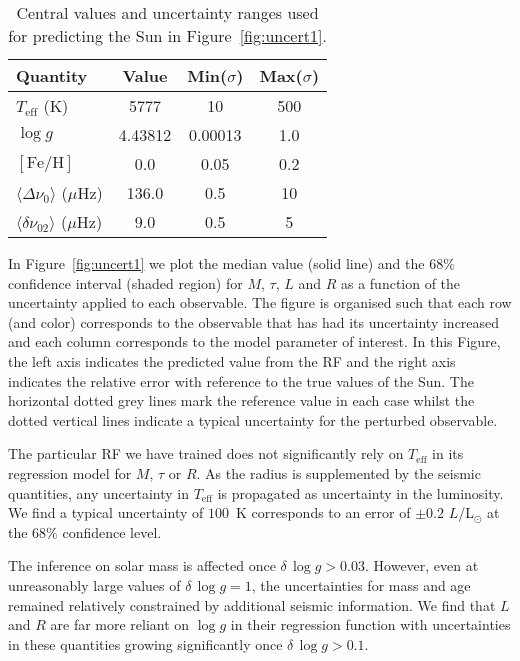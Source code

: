  
 \begin{table}
 \centering
    \caption{Central values and uncertainty ranges used for predicting the Sun in Figure~\ref{fig:uncert1}.}
    \begin{tabular}{lccc}
    \hline \hline
Quantity & Value & Min($\sigma$) & Max($\sigma$) \\ \hline 
$T_{\text{eff}}$ (K)  & 5777 & 10  & 500\\
$\log{} g$ &  4.43812 & 0.00013 & 1.0\\
$[\text{Fe/H}]$ & 0.0 & 0.05 & 0.2 \\
$\langle\Delta\nu_0\rangle$ ($\mu$Hz) & 136.0 & 0.5 & 10\\
$\langle\delta\nu_{02}\rangle$ ($\mu$Hz)& 9.0 & 0.5 & 5 \\
\hline
    \end{tabular}
    \label{tab:sun}
\end{table}

 
In Figure~\ref{fig:uncert1} we plot the median value (solid line) and the $68\%$  confidence interval (shaded region)
 for $M$, $\tau$, $L$ and $R$ as a function of the uncertainty applied to each observable. The figure is organised such that each row (and color) corresponds to the observable that has had its uncertainty increased and each column corresponds to the model parameter of interest. In this Figure, the left axis indicates the predicted value from the RF and the right axis indicates the relative error with reference to the true values of the Sun.  The horizontal dotted grey lines mark the reference value in each case whilst the dotted vertical lines indicate a typical uncertainty for the perturbed observable. 

The particular RF we have trained does not significantly rely on $T_{\text{eff}}$ in its regression model for $M$, $\tau$ or $R$. As the radius is supplemented by the seismic quantities, any uncertainty in $T_{\text{eff}}$ is propagated as uncertainty in the luminosity. We find a typical uncertainty of $100$~K corresponds to an error of ${\pm 0.2}$ $L$/L$_{\odot}$ at the $68\%$ confidence level.

The inference on solar mass is affected once ${\delta \, \log{} g > 0.03}$. 
However, even at unreasonably large values of  ${\delta \, \log{} g = 1}$, the uncertainties for mass and age remained relatively constrained by additional seismic information. We find 
that $L$ and $R$ are far more reliant on ${\log{} g}$ in their regression function with uncertainties in these quantities growing significantly once  ${\delta \, \log{} g > 0.1}$.

